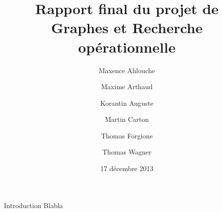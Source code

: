 \documentclass{beamer}
\title[Rapport final de GRO]
      {Rapport final du projet de\\Graphes et Recherche opérationnelle}
\institute{Enseeiht}
\author
  [Ahlouche \and Arthaud \and Auguste
    \and Carton \and Forgione \and Wagner]
  {Maxence Ahlouche \and Maxime Arthaud \and Korantin Auguste
    \and Martin Carton \and Thomas Forgione \and Thomas Wagner}
\date{17 décembre 2013}
\begin{document}
\begin{frame}
  \titlepage
\end{frame}

\begin{frame}{Introduction}
  Blabla
\end{frame}
\end{document}
